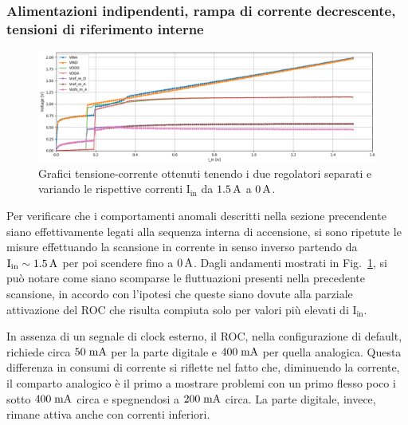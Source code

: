 

\subsubsection{Alimentazioni indipendenti, rampa di corrente decrescente, tensioni di riferimento interne}

\begin{figure}
\centering
\includegraphics[width=\textwidth]{Immagini/IDI2}
\caption{Grafici tensione-corrente ottenuti tenendo i due regolatori separati e variando le rispettive correnti $\mathrm{I_{in}}$ da $1.5\rm \, A$ a $0\rm \, A$.}
\label{IDI}
\end{figure}

Per verificare che i comportamenti anomali descritti nella sezione precendente siano effettivamente legati alla sequenza interna di accensione, si sono ripetute le misure effettuando la scansione in corrente in senso inverso partendo da $\mathrm{I_{in}}\sim1.5\rm \, A$ per poi scendere fino a $0\rm \, A$. Dagli andamenti mostrati in Fig.~\ref{IDI}, si può notare come siano scomparse le fluttuazioni presenti nella precedente scansione, in accordo con l'ipotesi che queste siano dovute alla parziale attivazione del ROC che risulta compiuta solo per valori pi\`u elevati di $\mathrm{I_{in}}$. 

In assenza di un segnale di clock esterno, il ROC, nella configurazione di default, richiede circa $50\rm \; mA$ per la parte digitale e $400\rm \; mA$ per quella analogica.
Questa differenza in consumi di corrente si riflette nel fatto che, diminuendo la corrente, il comparto analogico \`e il primo a mostrare problemi con un primo flesso poco i sotto $400\rm \; mA$ circa e spegnendosi a $200\rm \; mA$ circa. La parte digitale, invece, rimane attiva anche con correnti inferiori.

